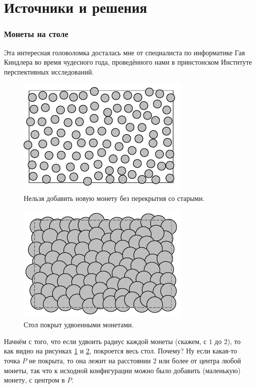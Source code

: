 \section*{Источники и решения}

\subsubsection*{Монеты на столе}

Эта интересная головоломка досталась мне от специалиста по информатике Гая Киндлера во время чудесного года, проведённого нами в принстонском Институте перспективных исследований.

\begin{figure}[t!]
\centering
\includegraphics[scale=1]{pics/coin1}
\caption{Нельзя добавить новую монету без перекрытия со старыми.}
\label{pic:coin1}
\end{figure}

\begin{figure}[b!]
\centering
\includegraphics[scale=1]{pics/coin2}
\caption{Стол покрыт удвоенными монетами.}
\label{pic:coin2}
\end{figure}

Начнём с того, что если удвоить радиус каждой монеты (скажем, с $1$ до $2$), то как видно на рисунках \ref{pic:coin1} и \ref{pic:coin2}, покроется весь стол.
Почему?
Ну если какая-то точка $P$ не покрыта, то она лежит на расстоянии $2$ или более от центра любой монеты, так что к исходной конфигурации можно было добавить (маленькую) монету, с центром в $P$.

